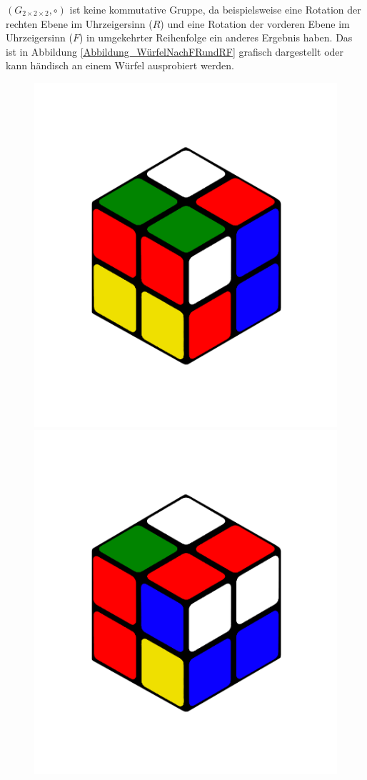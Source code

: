 \documentclass[12pt,a4paper, usenames, dvipsnames]{article}
\theoremstyle{mystyle}
\theoremstyle{definition}
\newcommand{\Gtwo}{\ensuremath{G_{2\times 2\times 2}}}
\begin{document}
$(\Gtwo, \circ)$ ist keine kommutative Gruppe, da beispielsweise eine Rotation der rechten Ebene im Uhrzeigersinn ($R$) und eine Rotation der vorderen Ebene im Uhrzeigersinn ($F$) in umgekehrter Reihenfolge ein anderes Ergebnis haben. Das ist in Abbildung \ref{Abbildung_WürfelNachFRundRF} grafisch dargestellt oder kann händisch an einem Würfel ausprobiert werden.
\begin{figure}[H]
\centering
\includegraphics[scale=0.1]{RF.png}
\includegraphics[scale=0.1]{FR.png}

\end{figure}
\end{document}
